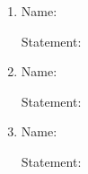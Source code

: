\documentclass[11pt]{article}
\begin{document}
\begin{enumerate}
\begin{enumerate}
    \item[\fbox{\bf L}] Name:

    \vfill

    Statement:

    \vfill
    \vfill
    \vfill
    \vfill

    \item[\fbox{\bf I}] Name:

    \vfill

    Statement:

    \vfill
    \vfill
    \vfill
    \vfill

    \item[\fbox{\bf D}] Name:

    \vfill

    Statement:

    \vfill
    \vfill
    \vfill
    \vfill

  \end{enumerate}

\end{enumerate}
\end{document}
